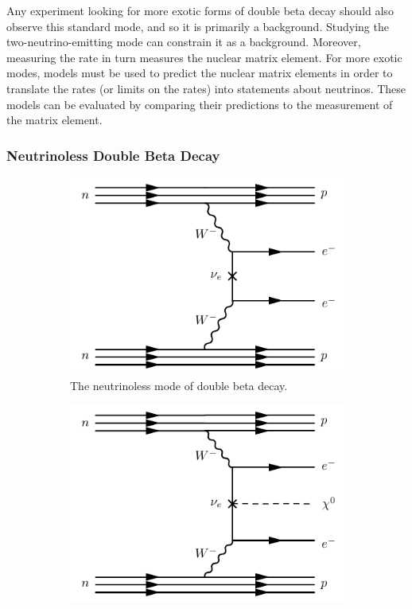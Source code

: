 \documentclass[herrin-thesis.tex]{subfiles}
\begin{document}
Any experiment looking for more exotic forms of double beta decay should also observe this standard mode, and so it is primarily a background. Studying the two-neutrino-emitting mode can constrain it as a background. Moreover, measuring the rate in turn measures the nuclear matrix element. For more exotic modes, models must be used to predict the nuclear matrix elements in order to translate the rates (or limits on the rates) into statements about neutrinos. These models can be evaluated by comparing their predictions to the measurement of the \twonu{} matrix element.

\subsubsection{Neutrinoless Double Beta Decay}

\begin{figure}[htp]
         \begin{subfigure}[b]{0.48\textwidth}
		\centering
		\includegraphics[width=\textwidth]{./feynman_diagrams/zeronubetabeta.pdf}
		\caption[\(0\nu\beta\beta\) decay]{The neutrinoless mode of double beta decay.}
		\label{fig:nu_diagram_0nubb}
	\end{subfigure}\hfill%
         \begin{subfigure}[b]{0.48\textwidth}
		\centering
		\includegraphics[width=\textwidth]{./feynman_diagrams/zeronubetabetamajoron.pdf}

\end{subfigure}
\end{figure}
\end{document}
